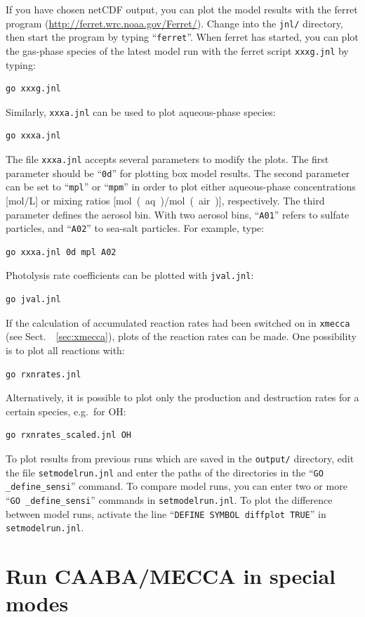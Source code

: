 \documentclass[twoside]{article}
\begin{document}
If you have chosen netCDF output, you can plot the model results with
the ferret program (\url{http://ferret.wrc.noaa.gov/Ferret/}). Change
into the \verb|jnl/| directory, then start the program by typing
``\verb|ferret|''. When ferret has started, you can plot the gas-phase
species of the latest model run with the ferret script \verb|xxxg.jnl|
by typing:
\begin{verbatim}
go xxxg.jnl
\end{verbatim}
Similarly, \verb|xxxa.jnl| can be used to plot aqueous-phase species:
\begin{verbatim}
go xxxa.jnl
\end{verbatim}
The file \verb|xxxa.jnl| accepts several parameters to modify the plots.
The first parameter should be ``\verb|0d|'' for plotting box model
results. The second parameter can be set to ``\verb|mpl|'' or
``\verb|mpm|'' in order to plot either aqueous-phase concentrations
[\unit{mol/L}] or mixing ratios [\unit{mol(aq)/mol(air)}], respectively.
The third parameter defines the aerosol bin. With two aerosol bins,
``\verb|A01|'' refers to sulfate particles, and ``\verb|A02|'' to
sea-salt particles. For example, type:
\begin{verbatim}
go xxxa.jnl 0d mpl A02
\end{verbatim}
Photolysis rate coefficients can be plotted with \verb|jval.jnl|:
\begin{verbatim}
go jval.jnl
\end{verbatim}
If the calculation of accumulated reaction rates had been switched on in
\verb|xmecca| (see Sect.~~\ref{sec:xmecca}), plots of the reaction rates
can be made. One possibility is to plot all reactions with:
\begin{verbatim}
go rxnrates.jnl
\end{verbatim}
Alternatively, it is possible to plot only the production and
destruction rates for a certain species, e.g.\ for OH:
\begin{verbatim}
go rxnrates_scaled.jnl OH
\end{verbatim}
To plot results from previous runs which are saved in the \verb|output/|
directory, edit the file \verb|setmodelrun.jnl| and enter the paths of
the directories in the ``\verb|GO _define_sensi|'' command. To compare
model runs, you can enter two or more ``\verb|GO _define_sensi|''
commands in \verb|setmodelrun.jnl|. To plot the difference between model
runs, activate the line ``\verb|DEFINE SYMBOL diffplot TRUE|'' in
\verb|setmodelrun.jnl|.

\section{Run CAABA/MECCA in special modes}
\label{sec:special}
\end{document}
